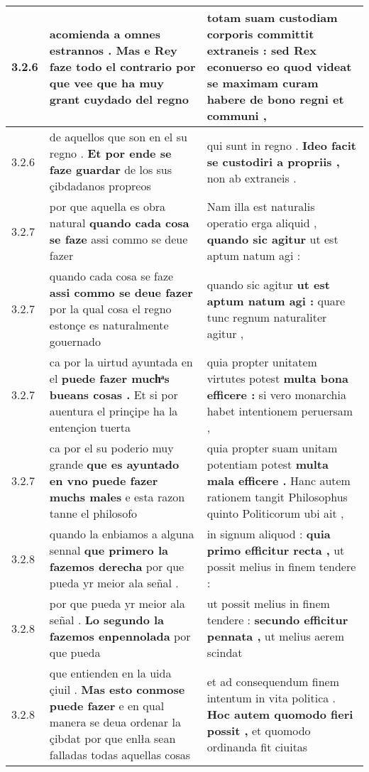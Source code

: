 \begin{tabular}{|p{1cm}|p{6.5cm}|p{6.5cm}|}
3.2.6 & acomienda a omnes estrannos . \textbf{ Mas e Rey faze todo el contrario } por que vee que ha muy grant cuydado del regno & totam suam custodiam corporis committit extraneis : \textbf{ sed Rex econuerso eo } quod videat se maximam curam habere de bono regni et communi , \\\hline
3.2.6 & de aquellos que son en el su regno . \textbf{ Et por ende se faze guardar } de los sus çibdadanos propreos & qui sunt in regno . \textbf{ Ideo facit se custodiri a propriis , } non ab extraneis . \\\hline
3.2.7 & por que aquella es obra natural \textbf{ quando cada cosa se faze } assi commo se deue fazer & Nam illa est naturalis operatio erga aliquid , \textbf{ quando sic agitur } ut est aptum natum agi : \\\hline
3.2.7 & quando cada cosa se faze \textbf{ assi commo se deue fazer } por la qual cosa el regno estonçe es naturalmente gouernado & quando sic agitur \textbf{ ut est aptum natum agi : } quare tunc regnum naturaliter agitur , \\\hline
3.2.7 & ca por la uirtud ayuntada en el \textbf{ puede fazer muchͣs bueans cosas . } Et si por auentura el prinçipe ha la entençion tuerta & quia propter unitatem virtutes potest \textbf{ multa bona efficere : } si vero monarchia habet intentionem peruersam , \\\hline
3.2.7 & ca por el su poderio muy grande \textbf{ que es ayuntado en vno puede fazer muchs males } e esta razon tanne el philosofo & quia propter suam unitam potentiam potest \textbf{ multa mala efficere . } Hanc autem rationem tangit Philosophus quinto Politicorum ubi ait , \\\hline
3.2.8 & quando la enbiamos a alguna sennal \textbf{ que primero la fazemos derecha } por que pueda yr meior ala señal . & in signum aliquod : \textbf{ quia primo efficitur recta , } ut possit melius in finem tendere : \\\hline
3.2.8 & por que pueda yr meior ala señal . \textbf{ Lo segundo la fazemos enpennolada } por que pueda & ut possit melius in finem tendere : \textbf{ secundo efficitur pennata , } ut melius aerem scindat \\\hline
3.2.8 & que entienden en la uida çiuil . \textbf{ Mas esto conmose puede fazer } e en qual manera se deua ordenar la çibdat por que enlła sean falladas todas aquellas cosas & et ad consequendum finem intentum in vita politica . \textbf{ Hoc autem quomodo fieri possit , } et quomodo ordinanda fit ciuitas \\\hline

\end{tabular}

